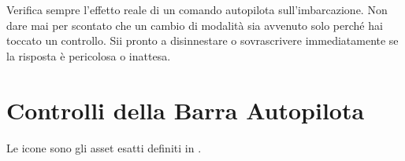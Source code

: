 \begin{warningbox}
Verifica sempre l'effetto reale di un comando autopilota sull'imbarcazione.
Non dare mai per scontato che un cambio di modalità sia avvenuto solo perché hai toccato
un controllo.
Sii pronto a disinnestare o sovrascrivere immediatamente se la risposta è pericolosa
o inattesa.
\end{warningbox}


\section{Controlli della Barra Autopilota}

Le icone sono gli asset esatti definiti in .

